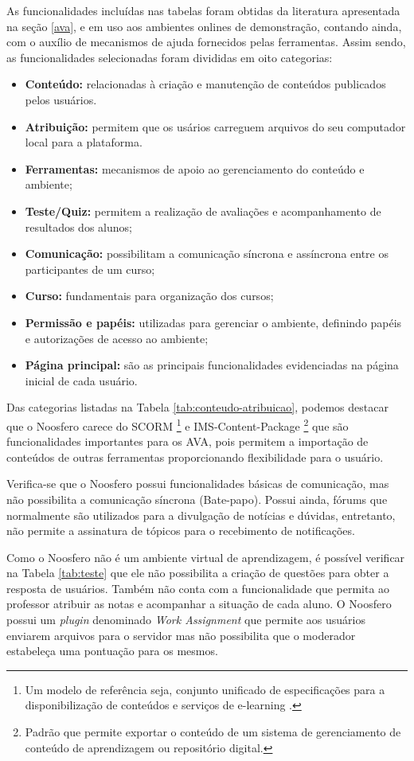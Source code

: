 As funcionalidades incluídas nas tabelas foram obtidas da literatura apresentada na seção \ref{ava}, e em uso aos ambientes onlines de demonstração, contando ainda, com o auxílio de mecanismos de ajuda fornecidos pelas ferramentas. Assim sendo, as funcionalidades selecionadas foram divididas em oito categorias:
\begin{itemize}
\item \textbf{Conteúdo:} relacionadas à criação e manutenção de conteúdos publicados pelos usuários.
\item \textbf{Atribuição:} permitem que os usários carreguem arquivos do seu computador local para a plataforma.
\item \textbf{Ferramentas:} mecanismos de apoio ao gerenciamento do conteúdo e ambiente;
\item \textbf{Teste/Quiz:} permitem a realização de avaliações e acompanhamento de resultados dos alunos;
\item \textbf{Comunicação:} possibilitam a comunicação síncrona e assíncrona entre os participantes de um curso;
\item \textbf{Curso:} fundamentais para organização dos cursos;
\item \textbf{Permissão e papéis:} utilizadas para gerenciar o ambiente, definindo papéis e autorizações de acesso ao ambiente;
\item \textbf{Página principal:} são as principais funcionalidades evidenciadas na página inicial de cada usuário.
\end{itemize}

Das categorias listadas na Tabela \ref{tab:conteudo-atribuicao}, podemos destacar que o Noosfero carece do SCORM \footnote{Um modelo de referência seja, conjunto unificado de especificações para a disponibilização de conteúdos e serviços de e-learning \cite{de2006objetos}.} e IMS-Content-Package \footnote{Padrão que permite exportar o conteúdo de um sistema de gerenciamento de conteúdo de aprendizagem ou repositório digital.} que são funcionalidades importantes para os AVA, pois permitem a importação de conteúdos de outras ferramentas proporcionando flexibilidade para o usuário.

Verifica-se que o Noosfero possui funcionalidades básicas de comunicação, mas não possibilita a comunicação síncrona (Bate-papo). Possui ainda, fórums que normalmente são utilizados para a divulgação de notícias e dúvidas, entretanto, não permite a assinatura de tópicos para o recebimento de notificações.

Como o Noosfero não é um ambiente virtual de aprendizagem, é possível verificar na Tabela \ref{tab:teste} que ele não possibilita a criação de questões para obter a resposta de usuários. Também não conta com a funcionalidade que permita ao professor atribuir as notas e acompanhar a situação de cada aluno. O Noosfero possui um \textit{plugin} denominado \textit{Work Assignment} que permite aos usuários enviarem arquivos para o servidor mas não possibilita que o moderador estabeleça uma pontuação para os mesmos.

